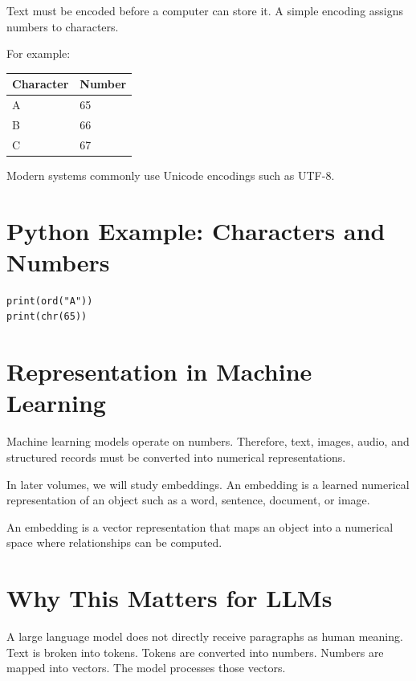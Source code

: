 Text must be encoded before a computer can store it. A simple encoding assigns numbers to characters.

For example:

\begin{center}
\begin{tabular}{ll}
\toprule
Character & Number \\
\midrule
A & 65 \\
B & 66 \\
C & 67 \\
\bottomrule
\end{tabular}
\end{center}

Modern systems commonly use Unicode encodings such as UTF-8.

\section{Python Example: Characters and Numbers}

\begin{lstlisting}
print(ord("A"))
print(chr(65))
\end{lstlisting}

\section{Representation in Machine Learning}

Machine learning models operate on numbers. Therefore, text, images, audio, and structured records must be converted into numerical representations.

In later volumes, we will study embeddings. An embedding is a learned numerical representation of an object such as a word, sentence, document, or image.

\begin{definition}
An embedding is a vector representation that maps an object into a numerical space where relationships can be computed.
\end{definition}

\section{Why This Matters for LLMs}

A large language model does not directly receive paragraphs as human meaning. Text is broken into tokens. Tokens are converted into numbers. Numbers are mapped into vectors. The model processes those vectors.

